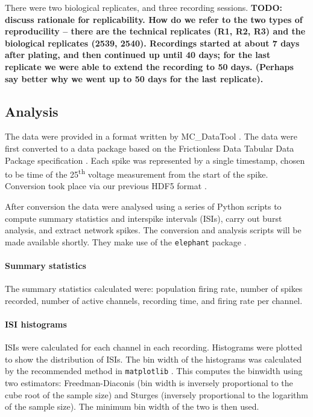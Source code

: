 \documentclass[doublespacing]{bmcart}
\begin{document}
\par There were two biological replicates, and three recording
sessions.  \textbf{TODO: discuss rationale for replicability.  How do we refer to the two types of reproducility -- there are the technical replicates (R1, R2, R3) and the biological replicates (2539, 2540).  Recordings started at about 7 days after plating, and then continued up until 40 days; for the last replicate we were able to extend the recording to 50 days.  (Perhaps say better why we went up to 50 days for the last replicate).}

\subsection*{Analysis}
\par The data were provided in a format written by MC\_DataTool \cite{Systems2014-tw}. The data were first converted to a data package based on the Frictionless Data Tabular Data Package specification \cite{Walsh2017-nm}. Each spike was represented by a single timestamp, chosen to be time of the 25\textsuperscript{th} voltage measurement from the start of the spike. Conversion took place via our previous HDF5 format \cite{Eglen2014}.

\par After conversion the data were analysed using a series of Python scripts to compute summary statistics and interspike intervals (ISIs), carry out burst analysis, and extract network spikes. The conversion and analysis scripts will be made available shortly. They make use of the \texttt{elephant} package \cite{elephant_toolkit}.

\paragraph{Summary statistics} The summary statistics calculated were: population firing rate, number of spikes recorded, number of active channels, recording time, and firing rate per channel.

\paragraph{ISI histograms} ISIs were calculated for each channel in each recording. Histograms were plotted to show the distribution of ISIs. The bin width of the histograms was calculated by the recommended method in \texttt{matplotlib} \cite{Community2020-xp}. This computes the binwidth using two estimators: Freedman-Diaconis (bin width is inversely proportional to the cube root of the sample size) and Sturges (inversely proportional to the logarithm of the sample size). The minimum bin width of the two is then used.
\end{document}
